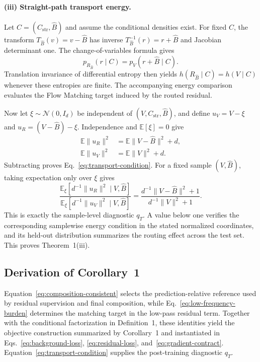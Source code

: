\paragraph{(iii) Straight-path transport energy.}
Let $C=(C_{\mathrm{str}},\hat B)$ and assume the conditional densities exist. For fixed $C$, the transform $T_{\hat B}(v)=v-\hat B$ has inverse $T_{\hat B}^{-1}(r)=r+\hat B$ and Jacobian determinant one. The change-of-variables formula gives
\begin{equation}
p_{R_{\hat B}}(r\mid C)=p_V(r+\hat B\mid C).
\end{equation}
Translation invariance of differential entropy then yields $h(R_{\hat B}\mid C)=h(V\mid C)$ whenever these entropies are finite. The accompanying energy comparison evaluates the Flow Matching target induced by the routed residual.

Now let $\xi\sim\mathcal N(0,I_d)$ be independent of $(V,C_{\mathrm{str}},\hat B)$, and define $u_V=V-\xi$ and $u_R=(V-\hat B)-\xi$. Independence and $\mathbb E[\xi]=0$ give
\begin{align}
\mathbb E\|u_R\|^2
&=
\mathbb E\|V-\hat B\|^2+d,\\
\mathbb E\|u_V\|^2
&=
\mathbb E\|V\|^2+d.
\end{align}
Subtracting proves Eq.~\ref{eq:transport-condition}. For a fixed sample $(V,\hat B)$, taking expectation only over $\xi$ gives
\begin{equation}
\frac{\mathbb E_{\xi}[d^{-1}\|u_R\|^2\mid V,\hat B]}
{\mathbb E_{\xi}[d^{-1}\|u_V\|^2\mid V,\hat B]}
=
\frac{d^{-1}\|V-\hat B\|^2+1}{d^{-1}\|V\|^2+1}.
\end{equation}
This is exactly the sample-level diagnostic $q_T$. A value below one verifies the corresponding samplewise energy condition in the stated normalized coordinates, and its held-out distribution summarizes the routing effect across the test set. This proves Theorem~1(iii).

\subsection{Derivation of Corollary~1}
Equation~\ref{eq:composition-consistent} selects the prediction-relative reference used by residual supervision and final composition, while Eq.~\ref{eq:low-frequency-burden} determines the matching target in the low-pass residual term. Together with the conditional factorization in Definition~1, these identities yield the objective construction summarized by Corollary~1 and instantiated in Eqs.~\ref{eq:background-loss}, \ref{eq:residual-loss}, and~\ref{eq:gradient-contract}. Equation~\ref{eq:transport-condition} supplies the post-training diagnostic $q_T$.


